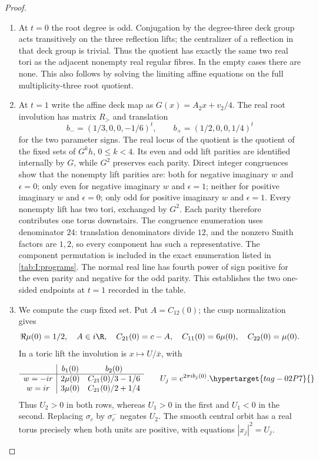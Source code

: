 \begin{proof}
\begin{enumerate}[label=\arabic*.,leftmargin=*]
\item At $t=0$ the root degree is odd. Conjugation by the degree-three deck
group acts transitively on the three reflection lifts; the centralizer
of a reflection in that deck group is trivial.
Thus the quotient has exactly the same two real tori as the adjacent
nonempty real regular fibres. In the empty cases there are none. This
also follows by solving the limiting affine equations on the full
multiplicity-three root quotient.

\item At $t=1$ write the affine deck map as
$G(x)=A_2x+v_2/4$. The real root involution has matrix $R_>$ and
translation
\[
 b_-=(1/3,0,0,-1/6)^t,
 \qquad b_+=(1/2,0,0,1/4)^t
\]
for the two parameter signs. The real locus of the quotient is the
quotient of the fixed sets of $G^kh$, $0\leq k<4$. Its even and odd
lift parities are identified internally by $G$, while $G^2$ preserves
each parity. Direct integer congruences show that the nonempty lift
parities are: both for negative imaginary $w$ and $\epsilon=0$; only even for
negative imaginary $w$ and $\epsilon=1$; neither for positive imaginary $w$ and $\epsilon=0$;
only odd for positive imaginary $w$ and $\epsilon=1$. Every nonempty lift has
two tori, exchanged by $G^2$. Each parity therefore contributes one
torus downstairs. The congruence enumeration uses denominator $24$:
translation denominators divide $12$, and the nonzero Smith factors are
$1,2$, so every component has such a representative. The component
permutation is included in the exact enumeration listed in
\cref{tab:I:programs}. The normal
real line has fourth power of sign positive for the even parity and
negative for the odd parity. This establishes the two one-sided
endpoints at $t=1$ recorded in the table.

\item We compute the cusp fixed set. Put
$A=C_{12}(0)$; the cusp normalization gives
\[
 \Re\mu(0)=1/2,\quad A\in i\R,\quad C_{21}(0)=c-A,
 \quad C_{11}(0)=6\mu(0),\quad C_{22}(0)=\mu(0).
\]
In a toric lift the involution is
$x\mapsto U/\bar x$, with
\[
\begin{array}{c|cc}
 &b_1(0)&b_2(0)\\\hline
 w=-ir&2\mu(0)&C_{21}(0)/3-1/6\\
 w=ir&3\mu(0)&C_{21}(0)/2+1/4
\end{array}
\qquad U_j=e^{2\pi i b_j(0)}.
\hypertarget{tag-02P7}{}\label{mapsI:real-eq-7}
\]
Thus $U_2>0$ in both rows, whereas $U_1>0$ in the first and $U_1<0$
in the second. Replacing $\sigma_c$ by $\sigma_c^-$ negates $U_2$.
The smooth central orbit has a real torus precisely when both units
are positive, with equations $|x_j|^2=U_j$.


\end{enumerate}
\end{proof}
